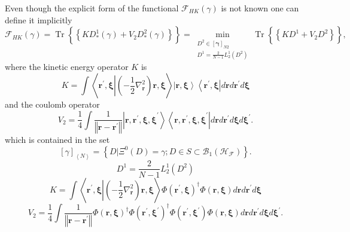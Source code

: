 \documentclass[aps,preprint]{revtex4}%
\begin{document}
Even though the explicit form of the functional $\mathcal{F}_{HK}\left(
\gamma\right)  $ is not known one can define it implicitly \cite{LevyLieb}
\begin{equation}
\mathcal{F}_{HK}\left(  \gamma\right)  =\operatorname{Tr}\left\{
\overset{}{\left\{  KD_{\ast}^{1}\left(  \gamma\right)  +V_{2}D_{\ast}%
^{2}\left(  \gamma\right)  \right\}  }\right\}  =\min_{\substack{D^{2}%
\in\left[  \mathbf{\gamma}\right]  _{N2}\\D^{1}=\frac{2}{N-1}L_{2}^{1}\left(
D^{2}\right)  }}\operatorname{Tr}\left\{  \overset{}{\left\{  KD^{1}%
+V_{2}D^{2}\right\}  }\right\}  , \label{HK}%
\end{equation}
where the kinetic energy operator $K$ is
\begin{equation}
K=\int\left\langle \mathbf{r}^{\prime}\mathbf{,\xi}\left\vert \left(
-\frac{1}{2}\nabla_{\mathbf{r}}^{2}\right)  \mathbf{r,\xi}\right.
\right\rangle \left\vert \mathbf{r,\xi}\right\rangle \left\langle
\mathbf{r}^{\prime}\mathbf{,\xi}\right\vert d\mathbf{r}d\mathbf{r}^{\prime
}d\mathbf{\xi}%
\end{equation}
and the coulomb operator
\begin{equation}
V_{2}=\frac{1}{4}\int\frac{1}{\left\Vert \mathbf{r-r}^{\prime}\right\Vert
}\left\vert \mathbf{r,\mathbf{r}^{\prime},\xi,\xi}^{\prime}\right\rangle
\left\langle \mathbf{r,\mathbf{r}^{\prime},\xi,\xi}^{\prime}\right\vert
d\mathbf{r}d\mathbf{r}^{\prime}d\mathbf{\xi}d\mathbf{\xi}^{\prime}.
\end{equation}
which is contained in the set
\begin{equation}
\left[  \gamma\right]  _{\left\langle N\right\rangle }=\left\{  \left.
D\right\vert \Xi^{0}\left(  D\right)  =\gamma;D\in S\subset\mathcal{B}%
_{1}\left(  \mathcal{H}_{\mathcal{F}}\right)  \right\}  .
\end{equation}%
\begin{equation}
D^{1}=\frac{2}{N-1}L_{2}^{1}\left(  D^{2}\right)
\end{equation}%
\begin{equation}
K=\int\left\langle \mathbf{r}^{\prime}\mathbf{,\xi}\left\vert \left(
-\frac{1}{2}\nabla_{\mathbf{r}}^{2}\right)  \mathbf{r,\xi}\right.
\right\rangle \Phi\left(  \mathbf{r}^{\prime}\mathbf{,\xi}\right)  ^{\dagger
}\Phi\left(  \mathbf{r,\xi}\right)  d\mathbf{r}d\mathbf{r}^{\prime
}d\mathbf{\xi}%
\end{equation}%
\begin{equation}
V_{2}=\frac{1}{4}\int\frac{1}{\left\Vert \mathbf{r-r}^{\prime}\right\Vert
}\Phi\left(  \mathbf{r,\xi}\right)  ^{\dagger}\Phi\left(  \mathbf{r}^{\prime
}\mathbf{,\xi}^{\prime}\right)  ^{\dagger}\Phi\left(  \mathbf{r}^{\prime
}\mathbf{,\xi}^{\prime}\right)  \Phi\left(  \mathbf{r,\xi}\right)
d\mathbf{r}d\mathbf{r}^{\prime}d\mathbf{\xi}d\mathbf{\xi}^{\prime}.
\end{equation}
\end{document}

